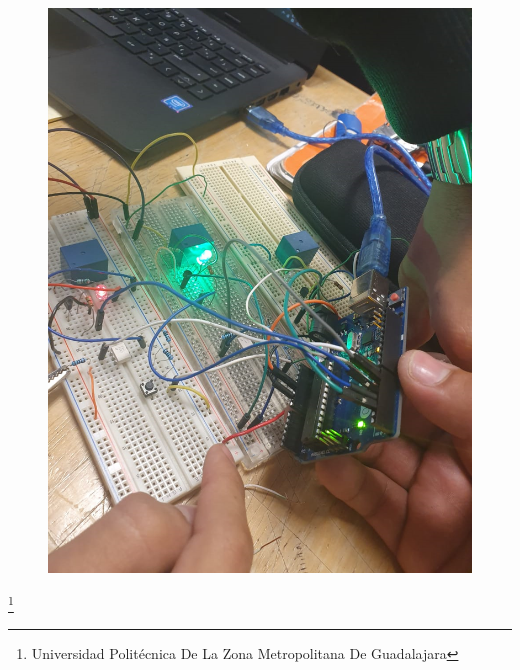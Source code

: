 \documentclass[10pt,a4paper]{article}
\begin{document}
\begin{figure}[hbtp]
\centering
\includegraphics[scale=0.25]{003.png} 
\end{figure}

\footnote{Universidad Politécnica De La Zona Metropolitana De Guadalajara}
\newpage
\end{document}
